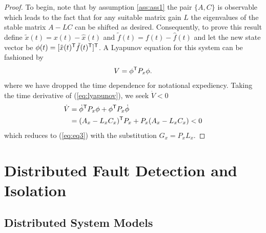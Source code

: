 \documentclass[letterpaper, 11 pt, conference]{ieeeconf}  %
\begin{document}
\begin{proof}
To begin, note that by assumption \ref{ass:ass1} the pair $\{A,C\}$ is observable which leads to the fact that for any suitable matrix gain $L$ the eigenvalues of the stable matrix $A-LC$ can be shifted as desired. Consequently, to prove this result define $\tilde{x}(t) = x(t) - \hat{x}(t)$ and $\tilde{f}(t) = f(t) - \hat{f}(t)$ and let the new state vector be $\phi(t) = [ \tilde{x}(t)^{\mathsf{T}} \tilde{f}(t)^{\mathsf{T}} ]^{\mathsf{T}}$. A Lyapunov equation for this system can be fashioned by
\begin{align} \label{eq:lyapunov}
V = \phi^{\mathsf{T}} P_x \phi.
\end{align}
where we have dropped the time dependence for notational expediency. Taking the time derivative of (\ref{eq:lyapunov}), we seek $\dot{V} < 0$
\begin{align*}
\dot{V} &= \dot{\phi}^{\mathsf{T}} P_x \phi + \phi^{\mathsf{T}} P_x \dot{\phi} \\
        &= (A_x - L_x C_x)^{\mathsf{T}}P_x + P_x (A_x - L_x C_x) < 0
\end{align*}
which reduces to (\ref{eq:eq3}) with the substitution $G_x = P_x L_x$. 
\end{proof}

\section{Distributed Fault Detection and Isolation} \label{sec:dpio}
\subsection{Distributed System Models}
\end{document}
